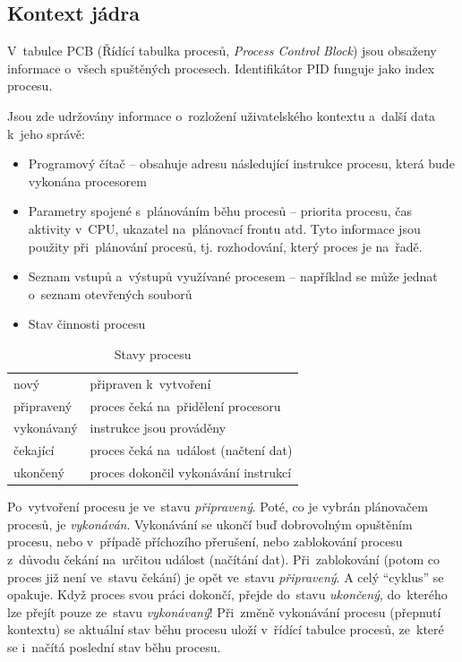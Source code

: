 \subsection{Kontext jádra}

V~tabulce PCB (Řídící tabulka procesů, \emph{Process Control Block}) jsou obsaženy informace o~všech spuštěných procesech. Identifikátor PID funguje jako index procesu.

Jsou zde udržovány informace o~rozložení uživatelského kontextu a~další data k~jeho správě:

\begin{itemize}[noitemsep]
	\item Programový čítač -- obsahuje adresu následující instrukce procesu, která bude vykonána procesorem
	\item Parametry spojené s~plánováním běhu procesů -- priorita procesu, čas aktivity v~CPU, ukazatel na~plánovací frontu atd. Tyto informace jsou použity při~plánování procesů, tj. rozhodování, který proces je na~řadě.
	\item Seznam vstupů a~výstupů využívané procesem -- například se může jednat o~seznam otevřených souborů
	\item Stav činnosti procesu
\end{itemize}

\begin{table}[ht]
	\centering
	\begin{tabular}{l|l}
	nový       & připraven k~vytvoření \\
	připravený & proces čeká na~přidělení procesoru \\
	vykonávaný & instrukce jsou prováděny \\
	čekající   & proces čeká na~událost (načtení dat) \\
	ukončený   & proces dokončil vykonávání instrukcí \\
	\end{tabular}
	\caption{Stavy procesu}
\end{table}

Po~vytvoření procesu je ve~stavu \emph{připravený}. Poté, co je vybrán plánovačem procesů, je \emph{vykonáván}. Vykonávání se ukončí buď dobrovolným opuštěním procesu, nebo v~případě příchozího přerušení, nebo zablokování procesu z~důvodu čekání na~určitou událost (načítání dat). Při~zablokování (potom co proces již není ve~stavu čekání) je opět ve~stavu \emph{připravený}. A celý \enquote{cyklus} se opakuje. Když proces svou práci dokončí, přejde do~stavu \emph{ukončený}, do~kterého lze přejít pouze ze~stavu \emph{vykonávaný}! Při~změně vykonávání procesu (přepnutí kontextu) se aktuální stav běhu procesu uloží v~řídící tabulce procesů, ze~které se i~načítá poslední stav běhu procesu.

